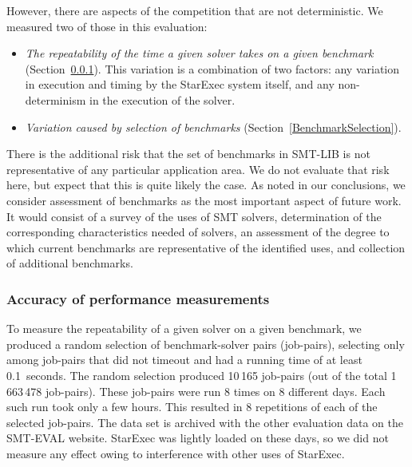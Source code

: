 \documentclass[smallcondensed]{svjour3}
\begin{document}
However, there are aspects of the competition that are not deterministic. We measured two of those in this evaluation:
\begin{itemize}[noitemsep,nolistsep]
\item {\em The repeatability of the time a given solver takes on a given benchmark} (Section~\ref{Accuracy}). This variation is a combination of two factors: any variation in execution and timing by the StarExec system itself, and any non-determinism in the execution of the solver.
\item {\em Variation caused by selection of benchmarks} (Section~\ref{BenchmarkSelection}). \end{itemize}
 
 There is the additional risk that the set of benchmarks in SMT-LIB is not representative of any particular application area. 
We do not evaluate that risk here, but expect that this is quite likely the case.
As noted in our conclusions, we consider assessment of benchmarks as the most 
important aspect of future work. It would consist of a survey of the uses of SMT solvers, determination of the corresponding characteristics needed of solvers, an assessment of the degree to which current benchmarks are representative of the identified uses, and collection of additional benchmarks.

 
\subsubsection{Accuracy of performance measurements}
\label{Accuracy}

To measure the repeatability of a given solver on a given benchmark, we produced a random selection of benchmark-solver pairs (job-pairs), selecting only among job-pairs that did not timeout and had a running time of at least 0.1~seconds. The random selection produced 10\,165 job-pairs (out of the total 1\,663\,478 job-pairs). These job-pairs were run 8 times on 8 different days. Each such run took only a few hours. This resulted in 8 repetitions of each of the selected job-pairs. The data set is archived with the other evaluation data on the SMT-EVAL website. StarExec was lightly loaded on these days, so we did not measure any effect owing to interference with other uses of StarExec.
\end{document}
